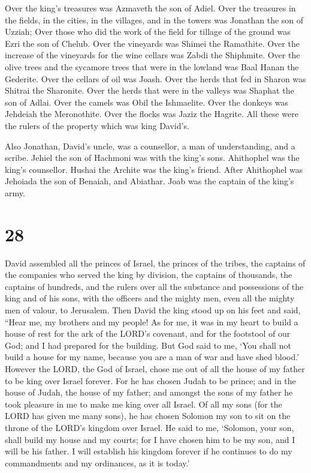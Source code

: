  Over the king's treasures was Azmaveth the son of Adiel.
Over the treasures in the fields, in the cities, in the villages, and in
the towers was Jonathan the son of Uzziah;  Over those who
did the work of the field for tillage of the ground was Ezri the son of
Chelub.  Over the vineyards was Shimei the Ramathite. Over
the increase of the vineyards for the wine cellars was Zabdi the
Shiphmite.  Over the olive trees and the sycamore trees
that were in the lowland was Baal Hanan the Gederite. Over the cellars
of oil was Joash.  Over the herds that fed in Sharon was
Shitrai the Sharonite. Over the herds that were in the valleys was
Shaphat the son of Adlai.  Over the camels was Obil the
Ishmaelite. Over the donkeys was Jehdeiah the Meronothite. Over the
flocks was Jaziz the Hagrite.  All these were the rulers of
the property which was king David's.

 Also Jonathan, David's uncle, was a counsellor, a man of
understanding, and a scribe. Jehiel the son of Hachmoni was with the
king's sons.  Ahithophel was the king's counsellor. Hushai
the Archite was the king's friend.  After Ahithophel was
Jehoiada the son of Benaiah, and Abiathar. Joab was the captain of the
king's army.

\hypertarget{section-27}{%
\section{28}\label{section-27}}

 David assembled all the princes of Israel, the princes of
the tribes, the captains of the companies who served the king by
division, the captains of thousands, the captains of hundreds, and the
rulers over all the substance and possessions of the king and of his
sons, with the officers and the mighty men, even all the mighty men of
valour, to Jerusalem.  Then David the king stood up on his
feet and said, ``Hear me, my brothers and my people! As for me, it was
in my heart to build a house of rest for the ark of the LORD's covenant,
and for the footstool of our God; and I had prepared for the building.
 But God said to me, `You shall not build a house for my
name, because you are a man of war and have shed blood.' 
However the LORD, the God of Israel, chose me out of all the house of my
father to be king over Israel forever. For he has chosen Judah to be
prince; and in the house of Judah, the house of my father; and amongst
the sons of my father he took pleasure in me to make me king over all
Israel.  Of all my sons (for the LORD has given me many
sons), he has chosen Solomon my son to sit on the throne of the LORD's
kingdom over Israel.  He said to me, `Solomon, your son,
shall build my house and my courts; for I have chosen him to be my son,
and I will be his father.  I will establish his kingdom
forever if he continues to do my commandments and my ordinances, as it
is today.'

